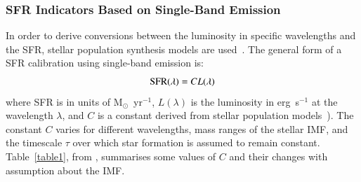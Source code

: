 \subsubsection*{SFR Indicators Based on Single-Band Emission}

In order to derive conversions between the luminosity in specific wavelengths and the SFR, stellar population synthesis models are used~\citep{Kennicutt98b}. 
The general form of a SFR calibration using single-band emission is: 
\begin{equation}
\label{equ: sfrsingle}
{\rm SFR}(\lambda)= CL(\lambda)
\end{equation}
where SFR is in units of M${_\odot}$~yr$^{-1}$, $L(\lambda)$ is the luminosity in erg~s$^{-1}$ at the wavelength $\lambda$, and $C$ is a constant derived from stellar population models~\citep[e.g, starburst99][]{Leitherer99}). 
The constant $C$ varies for different wavelengths, mass ranges of the stellar IMF, and the timescale $\tau$ over which star formation is assumed to remain constant. 
Table~\ref{table1}, from \cite{Calzetti13}, summarises some values of $C$ and their changes with assumption about the IMF. 


